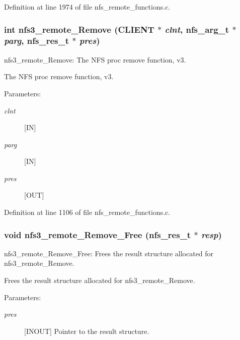 Definition at line 1974 of file nfs\_\-remote\_\-functions.c.
\subsubsection[{nfs3\_\-remote\_\-Remove}]{\setlength{\rightskip}{0pt plus 5cm}int nfs3\_\-remote\_\-Remove (CLIENT $\ast$ {\em clnt}, \/  nfs\_\-arg\_\-t $\ast$ {\em parg}, \/  nfs\_\-res\_\-t $\ast$ {\em pres})}\label{group__NFSprocs_g2b803ebb027674245c6f5a78f28df61c}


nfs3\_\-remote\_\-Remove: The NFS proc remove function, v3.

The NFS proc remove function, v3.

\begin{Desc}
\item[Parameters:]
\begin{description}
\item[{\em clnt}][IN] \item[{\em parg}][IN] \item[{\em pres}][OUT] \end{description}
\end{Desc}


Definition at line 1106 of file nfs\_\-remote\_\-functions.c.
\subsubsection[{nfs3\_\-remote\_\-Remove\_\-Free}]{\setlength{\rightskip}{0pt plus 5cm}void nfs3\_\-remote\_\-Remove\_\-Free (nfs\_\-res\_\-t $\ast$ {\em resp})}\label{group__NFSprocs_gf545f0c1feb970bf349509f03a2a3802}


nfs3\_\-remote\_\-Remove\_\-Free: Frees the result structure allocated for nfs3\_\-remote\_\-Remove.

Frees the result structure allocated for nfs3\_\-remote\_\-Remove.

\begin{Desc}
\item[Parameters:]
\begin{description}
\item[{\em pres}][INOUT] Pointer to the result structure. \end{description}
\end{Desc}


